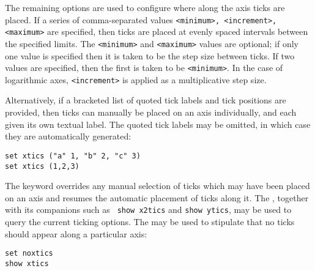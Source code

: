 The remaining options are used to configure where along the axis ticks are
placed. If a series of comma-separated values {\tt <minimum>, <increment>,
<maximum>} are specified, then ticks are placed at evenly spaced intervals
between the specified limits. The {\tt <minimum>} and {\tt <maximum>} values
are optional; if only one value is specified then it is taken to be the step
size between ticks. If two values are specified, then the first is taken to be
{\tt <minimum>}. In the case of logarithmic axes, {\tt <increment>} is applied
as a multiplicative step size.

Alternatively, if a bracketed list of quoted tick labels and tick positions are
provided, then ticks can manually be placed on an axis individually, and each
given its own textual label. The quoted tick labels may be omitted, in which
case they are automatically generated:
\begin{verbatim}
set xtics ("a" 1, "b" 2, "c" 3)
set xtics (1,2,3)
\end{verbatim}
The keyword  overrides any manual selection of ticks which
may have been placed on an axis and resumes the automatic placement of ticks
along it. The , together with its companions such as {\tt
show x2tics} and {\tt show ytics}, may be used to query the current ticking
options. The  may be used to stipulate that no ticks
should appear along a particular axis:

\begin{verbatim}
set noxtics
show xtics
\end{verbatim}

